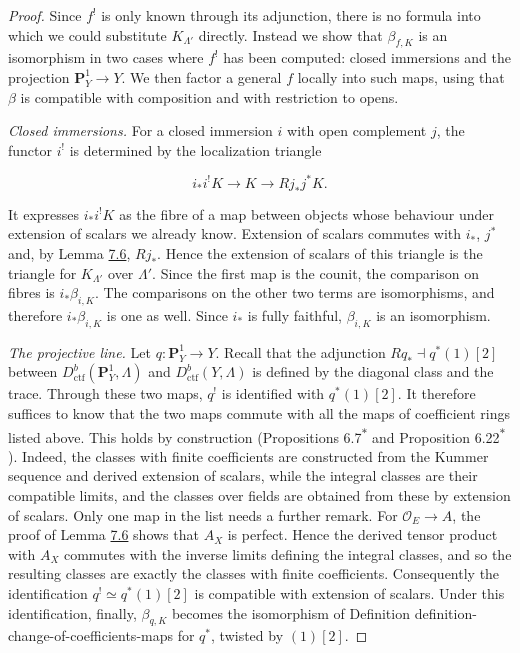 \documentclass[11pt]{article}
\newcommand{\bpout}[1]{#1\textsuperscript{\hyperlink{bp-outside}{\ensuremath{\ast}}}}
\begin{document}
\begin{proof}[{Proof}]\label{bp22}%
Since \(f^!\) is only known through its adjunction, there is no formula into which we could substitute \(K_{\Lambda'}\) directly. Instead we show that \(\beta_{f,K}\) is an isomorphism in two cases where \(f^!\) has been computed: closed immersions and the projection \(\mathbf P^1_Y\to Y\). We then factor a general \(f\) locally into such maps, using that \(\beta\) is compatible with composition and with restriction to opens.

\emph{Closed immersions.} For a closed immersion \(i\) with open complement \(j\), the functor \(i^!\) is determined by the localization triangle

\[
i_*i^!K\longrightarrow K\longrightarrow Rj_*j^*K.
\]

It expresses \(i_*i^!K\) as the fibre of a map between objects whose behaviour under extension of scalars we already know. Extension of scalars commutes with \(i_*\), \(j^*\) and, by Lemma \hyperref[bp16]{7.6}, \(Rj_*\). Hence the extension of scalars of this triangle is the triangle for \(K_{\Lambda'}\) over \(\Lambda'\). Since the first map is the counit, the comparison on fibres is \(i_*\beta_{i,K}\). The comparisons on the other two terms are isomorphisms, and therefore \(i_*\beta_{i,K}\) is one as well. Since \(i_*\) is fully faithful, \(\beta_{i,K}\) is an isomorphism.

\emph{The projective line.} Let \(q:\mathbf P^1_Y\to Y\). Recall that the adjunction \(Rq_*\dashv q^*(1)[2]\) between \(D^b_{\mathrm{ctf}}(\mathbf P^1_Y,\Lambda)\) and \(D^b_{\mathrm{ctf}}(Y,\Lambda)\) is defined by the diagonal class and the trace. Through these two maps, \(q^!\) is identified with \(q^*(1)[2]\). It therefore suffices to know that the two maps commute with all the maps of coefficient rings listed above. This holds by construction (Propositions \bpout{6.7} and \bpout{Proposition 6.22}). Indeed, the classes with finite coefficients are constructed from the Kummer sequence and derived extension of scalars, while the integral classes are their compatible limits, and the classes over fields are obtained from these by extension of scalars. Only one map in the list needs a further remark. For \(\mathcal O_E\to A\), the proof of Lemma \hyperref[bp16]{7.6} shows that \(A_X\) is perfect. Hence the derived tensor product with \(A_X\) commutes with the inverse limits defining the integral classes, and so the resulting classes are exactly the classes with finite coefficients. Consequently the identification \(q^!\simeq q^*(1)[2]\) is compatible with extension of scalars. Under this identification, finally, \(\beta_{q,K}\) becomes the isomorphism of Definition definition-change-of-coefficients-maps for \(q^*\), twisted by \((1)[2]\).


\end{proof}
\end{document}
